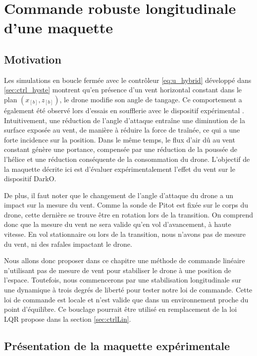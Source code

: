 \chapter{Commande robuste longitudinale d'une maquette}
\minitoc
\label{chap:3DOF}

\section{Motivation}
\label{sec:motivation3DOF}
Les simulations en boucle fermée avec le contrôleur \eqref{eq:u_hybrid} développé dans \ref{sec:ctrl_hyste} montrent qu'en présence d'un vent horizontal constant dans le plan $(x_{[b]},z_{[b]})$, le drone modifie son angle de tangage. Ce comportement a également été observé lors d'essais en soufflerie avec le dispositif expérimental \cite{olszaneckibarthHal-02542982}. Intuitivement, une réduction de l'angle d'attaque entraîne une diminution de la surface exposée au vent, de manière à réduire la force de traînée, ce qui a une forte incidence sur la position. Dans le même temps, le flux d'air dû au vent constant génère une portance, compensée par une réduction de la poussée de l'hélice et une réduction conséquente de la consommation du drone. L'objectif de la maquette décrite ici est d'évaluer expérimentalement l'effet du vent sur le dispositif DarkO.

De plus, il faut noter que le changement de l'angle d'attaque du drone a un impact sur la mesure du vent. Comme la sonde de Pitot est fixée sur le corps du drone, cette dernière se trouve être en rotation lors de la transition. On comprend donc que la mesure du vent ne sera valide qu'en vol d'avancement, à haute vitesse. En vol stationnaire ou lors de la transition, nous n'avons pas de mesure du vent, ni des rafales impactant le drone.

Nous allons donc proposer dans ce chapitre une méthode de commande linéaire n'utilisant pas de mesure de vent pour stabiliser le drone à une position de l'espace. Toutefois, nous commencerons par une stabilisation longitudinale sur une dynamique à trois degrés de liberté pour tester notre loi de commande. 
{ \color{blue}Cette loi de commande est locale et n'est valide que dans un environnement proche du point d'équilibre. Ce bouclage pourrait être utilisé en remplacement de la loi LQR propose dans la section \ref{sec:ctrlLin}.
}
\section{Présentation de la maquette expérimentale}
\label{sec:test_bench}



